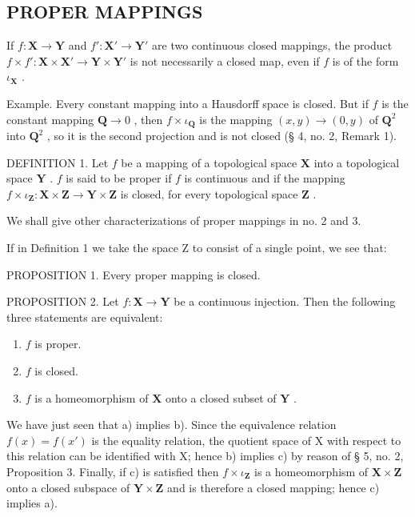 \subsection{PROPER MAPPINGS}

If \(f: \mathbf{X} \to \mathbf{Y}\) and \(f': \mathbf{X}' \to \mathbf{Y}'\) are two continuous closed mappings, the product \(f \times f': \mathbf{X} \times \mathbf{X}' \to \mathbf{Y} \times \mathbf{Y}'\) is not necessarily a closed map, even if \(f\) is of the form \(\iota_{\mathbf{X}}\) .

Example. Every constant mapping into a Hausdorff space is closed. But if \(f\) is the constant mapping \(\mathbf{Q} \to 0\) , then \(f \times \iota_{\mathbf{Q}}\) is the mapping \((x, y) \to (0, y)\) of \(\mathbf{Q}^2\) into \(\mathbf{Q}^2\) , so it is the second projection and is not closed (§ 4, no. 2, Remark 1).

DEFINITION 1. Let \(f\) be a mapping of a topological space \(\mathbf{X}\) into a topological space \(\mathbf{Y}\) . \(f\) is said to be proper if \(f\) is continuous and if the mapping \(f \times \iota_{\mathbf{Z}} : \mathbf{X} \times \mathbf{Z} \to \mathbf{Y} \times \mathbf{Z}\) is closed, for every topological space \(\mathbf{Z}\) .

We shall give other characterizations of proper mappings in no. 2 and 3.

If in Definition 1 we take the space Z to consist of a single point, we see that:

PROPOSITION 1. Every proper mapping is closed.

PROPOSITION 2. Let \(f: \mathbf{X} \to \mathbf{Y}\) be a continuous injection. Then the following three statements are equivalent:

\begin{enumerate}
\def\labelenumi{\alph{enumi})}
\item
  \(f\) is proper.
\item
  \(f\) is closed.
\item
  \(f\) is a homeomorphism of \(\mathbf{X}\) onto a closed subset of \(\mathbf{Y}\) .
\end{enumerate}

We have just seen that a) implies b). Since the equivalence relation \(f(x) = f(x')\) is the equality relation, the quotient space of X with respect to this relation can be identified with X; hence b) implies c) by reason of § 5, no. 2, Proposition 3. Finally, if c) is satisfied then \(f \times \iota_{\mathbf{Z}}\) is a homeomorphism of \(\mathbf{X} \times \mathbf{Z}\) onto a closed subspace of \(\mathbf{Y} \times \mathbf{Z}\) and is therefore a closed mapping; hence c) implies a).

